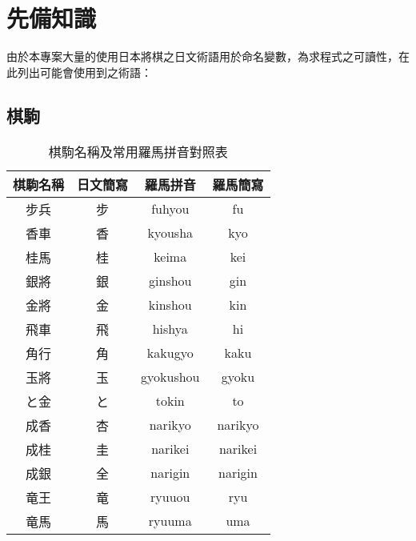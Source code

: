\section{先備知識}
    由於本專案大量的使用日本將棋之日文術語用於命名變數，為求程式之可讀性，在此列出可能會使用到之術語：
	\subsection{棋駒}
	\begin{table}[h]
	    \centering
	    \begin{tabular}{c|c|c|c}
	        棋駒名稱 & 日文簡寫 & 羅馬拼音 & 羅馬簡寫\\
	        \hline
	        步兵 & 步 & fuhyou & fu\\
	        香車 & 香 & kyousha & kyo\\
	        桂馬 & 桂 & keima & kei\\
	        銀將 & 銀 & ginshou & gin\\
	        金將 & 金 & kinshou & kin\\
	        飛車 & 飛 & hishya & hi\\
	        角行 & 角 & kakugyo & kaku\\
	        玉將 & 玉 & gyokushou & gyoku\\
	         \hline
	        と金 & と & tokin & to\\
	        成香 & 杏 & narikyo & narikyo\\
	        成桂 & 圭 & narikei & narikei\\
	        成銀 & 全 & narigin & narigin\\
	        竜王 & 竜 & ryuuou & ryu\\
	        竜馬 & 馬 & ryuuma & uma\\
	    \end{tabular}
	    \caption{棋駒名稱及常用羅馬拼音對照表}
	    \label{tab:my_label}
	\end{table}
